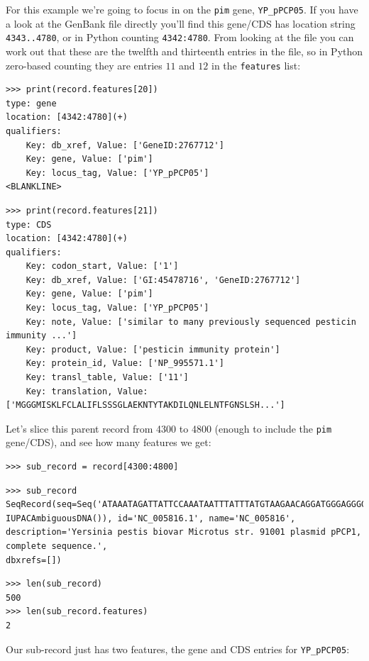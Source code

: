 \documentclass{report}
\begin{document}
For this example we're going to focus in on the \verb|pim| gene, \verb|YP_pPCP05|.
If you have a look at the GenBank file directly you'll find this gene/CDS has
location string \texttt{4343..4780}, or in Python counting \texttt{4342:4780}.
From looking at the file you can work out that these are the twelfth and
thirteenth entries in the file, so in Python zero-based counting they are
entries $11$ and $12$ in the \texttt{features} list:

\begin{verbatim}
>>> print(record.features[20])
type: gene
location: [4342:4780](+)
qualifiers: 
    Key: db_xref, Value: ['GeneID:2767712']
    Key: gene, Value: ['pim']
    Key: locus_tag, Value: ['YP_pPCP05']
<BLANKLINE>
\end{verbatim}
\begin{verbatim}
>>> print(record.features[21])
type: CDS
location: [4342:4780](+)
qualifiers: 
    Key: codon_start, Value: ['1']
    Key: db_xref, Value: ['GI:45478716', 'GeneID:2767712']
    Key: gene, Value: ['pim']
    Key: locus_tag, Value: ['YP_pPCP05']
    Key: note, Value: ['similar to many previously sequenced pesticin immunity ...']
    Key: product, Value: ['pesticin immunity protein']
    Key: protein_id, Value: ['NP_995571.1']
    Key: transl_table, Value: ['11']
    Key: translation, Value: ['MGGGMISKLFCLALIFLSSSGLAEKNTYTAKDILQNLELNTFGNSLSH...']
\end{verbatim}

Let's slice this parent record from 4300 to 4800 (enough to include the \verb|pim|
gene/CDS), and see how many features we get:

\begin{verbatim}
>>> sub_record = record[4300:4800]
\end{verbatim}
\begin{verbatim}
>>> sub_record
SeqRecord(seq=Seq('ATAAATAGATTATTCCAAATAATTTATTTATGTAAGAACAGGATGGGAGGGGGA...TTA',
IUPACAmbiguousDNA()), id='NC_005816.1', name='NC_005816',
description='Yersinia pestis biovar Microtus str. 91001 plasmid pPCP1, complete sequence.',
dbxrefs=[])
\end{verbatim}
\begin{verbatim}
>>> len(sub_record)
500
>>> len(sub_record.features)
2
\end{verbatim}

Our sub-record just has two features, the gene and CDS entries for \verb|YP_pPCP05|:
\end{document}
